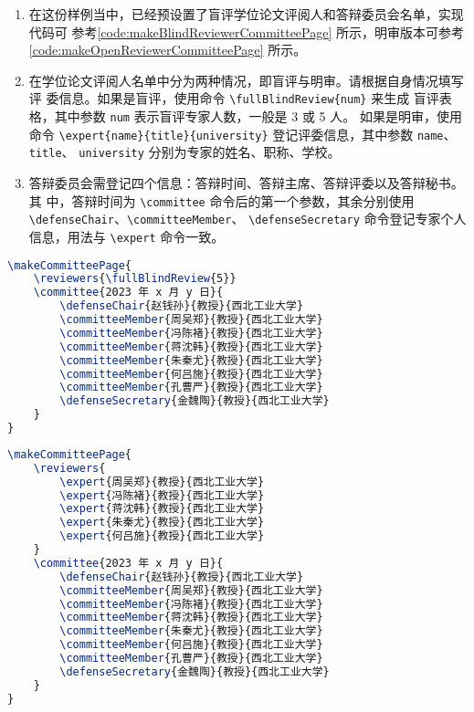 \documentclass[lang=chs, degree=phd, blindreview=false, winfonts=true, academic=true]{yanputhesis}
\begin{document}
\begin{enumerate}
    \setlength{\itemsep}{0pt}
    \item 在这份样例当中，已经预设置了盲评学位论文评阅人和答辩委员会名单，实现代码可
          参考\autoref{code:makeBlindReviewerCommitteePage} 所示，明审版本可参考
          \autoref{code:makeOpenReviewerCommitteePage} 所示。
    \item 在学位论文评阅人名单中分为两种情况，即盲评与明审。请根据自身情况填写评
          委信息。如果是盲评，使用命令 \lstinline`\fullBlindReview{num}` 来生成
          盲评表格，其中参数 \lstinline`num` 表示盲评专家人数，一般是 3 或 5 人。
          如果是明审，使用命令 \lstinline`\expert{name}{title}{university}`
          登记评委信息，其中参数 \lstinline`name`、\lstinline`title`、
          \lstinline`university` 分别为专家的姓名、职称、学校。
    \item 答辩委员会需登记四个信息：答辩时间、答辩主席、答辩评委以及答辩秘书。其
          中，答辩时间为 \lstinline`\committee` 命令后的第一个参数，其余分别使用
          \lstinline`\defenseChair`、\lstinline`\committeeMember`、
          \lstinline`\defenseSecretary` 命令登记专家个人信息，用法与
          \lstinline`\expert` 命令一致。
\end{enumerate}

\begin{lstlisting}[language={TeX}, label={code:makeBlindReviewerCommitteePage},
    caption={盲评样例 makeBlindReviewerCommitteePage.tex}]
\makeCommitteePage{
    \reviewers{\fullBlindReview{5}}
    \committee{2023 年 x 月 y 日}{
        \defenseChair{赵钱孙}{教授}{西北工业大学}
        \committeeMember{周吴郑}{教授}{西北工业大学}
        \committeeMember{冯陈褚}{教授}{西北工业大学}
        \committeeMember{蒋沈韩}{教授}{西北工业大学}
        \committeeMember{朱秦尤}{教授}{西北工业大学}
        \committeeMember{何吕施}{教授}{西北工业大学}
        \committeeMember{孔曹严}{教授}{西北工业大学}
        \defenseSecretary{金魏陶}{教授}{西北工业大学}
    }
}
\end{lstlisting}

\begin{lstlisting}[language={TeX}, label={code:makeOpenReviewerCommitteePage},
    caption={明审样例 makeOpenReviewerCommitteePage.tex}]
\makeCommitteePage{
    \reviewers{
        \expert{周吴郑}{教授}{西北工业大学}
        \expert{冯陈褚}{教授}{西北工业大学}
        \expert{蒋沈韩}{教授}{西北工业大学}
        \expert{朱秦尤}{教授}{西北工业大学}
        \expert{何吕施}{教授}{西北工业大学}
    }
    \committee{2023 年 x 月 y 日}{
        \defenseChair{赵钱孙}{教授}{西北工业大学}
        \committeeMember{周吴郑}{教授}{西北工业大学}
        \committeeMember{冯陈褚}{教授}{西北工业大学}
        \committeeMember{蒋沈韩}{教授}{西北工业大学}
        \committeeMember{朱秦尤}{教授}{西北工业大学}
        \committeeMember{何吕施}{教授}{西北工业大学}
        \committeeMember{孔曹严}{教授}{西北工业大学}
        \defenseSecretary{金魏陶}{教授}{西北工业大学}
    }
}
\end{lstlisting}
\end{document}
